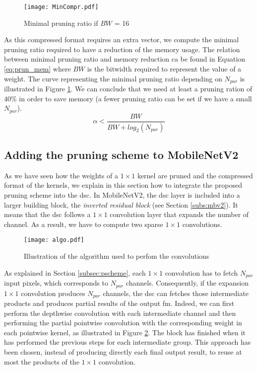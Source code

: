 %
\begin{figure}
    \centering
    \texttt{[image: MinCompr.pdf]}
    \caption{Minimal pruning ratio if $BW$ = 16}
    \label{fig:prun_mem}
\end{figure}
%
As this compressed format requires an extra vector, we compute the minimal pruning ratio required to have a reduction of the memory usage. The relation between minimal pruning ratio and memory reduction ca be found in Equation \eqref{eq:prun_mem} where $BW$ is the bitwidth required to represent the value of a weight. The curve representing the minimal pruning ratio depending on $N_{par}$ is illustrated in Figure \ref{fig:prun_mem}. We can conclude that we need at least a pruning ration of $40\%$ in order to save memory (a fewer pruning ratio can be set if we have a small $N_{par}$).
% 
\begin{equation}
    \alpha < \frac{BW}{ BW + log_2(N_{par})}
    \label{eq:prun_mem}
\end{equation}
%
\subsection{Adding the pruning scheme to MobileNetV2}
%
As we have seen how the weights of a $1 \times 1$ kernel are pruned and the compressed format of the kernels, we explain in this section how to integrate the proposed pruning scheme into the \acrshort{dsc}. In MobileNetV2, the \acrshort{dsc} layer is included into a larger building block, the \textit{inverted residual block} (see Section \ref{subs:mbv2}). It means that the \acrshort{dsc} follows a $1 \times 1$ convolution layer that expands the number of channel. As a result, we have to compute two sparse $1 \times 1$ convolutions. 

%
\begin{figure}
    \centering
    \texttt{[image: algo.pdf]}
    \caption{Illustration of the algorithm used to perfom the convolutions}
    \label{fig:algo}
\end{figure}
%
As explained in Section \ref{subsec:pscheme}, each $1 \times 1$ convolution has to fetch $N_{par}$ input pixels, which corresponds to $N_{par}$ channels. Consequently, if the expansion $1 \times 1$ convolution produces $N_{par}$ channels, the \acrshort{dsc} can fetches those intermediate products and produces partial results of the output \acrshort{fm}. Indeed, we can first perform the depthwise convolution with each intermediate channel and then performing the partial pointwise convolution with the corresponding weight in each pointwise kernel, as illustrated in Figure \ref{fig:algo}. The block has finished when it has performed the previous steps for each intermediate group. This approach has been chosen, instead of producing directly each final output result, to reuse at most the products of the $1 \times 1$ convolution.

